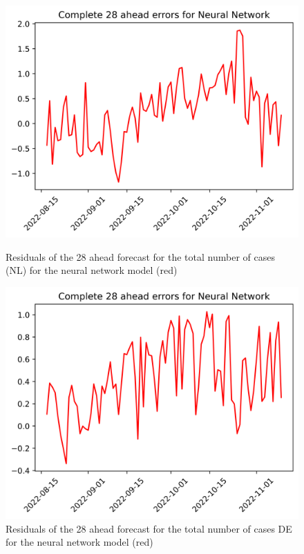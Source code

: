 \begin{figure}

\begin{minipage}{.45\textwidth}
  \centering
  \includegraphics[width=\linewidth]{pics/28_ah/28_ahead_errors_Neural Network.png}
  \caption{Residuals of the 28 ahead forecast for the total number of cases (NL) for the neural network model (red)}
  \label{fig:tot_cases_error_28_nn}
\end{minipage}
\begin{minipage}{.45\textwidth}
  \centering
  \includegraphics[width=\linewidth]{pics/28_ah/DE_28_ahead_errors_Neural Network.png}
  \caption{Residuals of the 28 ahead forecast for the total number of cases DE for the neural network model (red)}
  \label{fig:tot_cases_error_28_nn_DE}
\end{minipage}

\end{figure}
